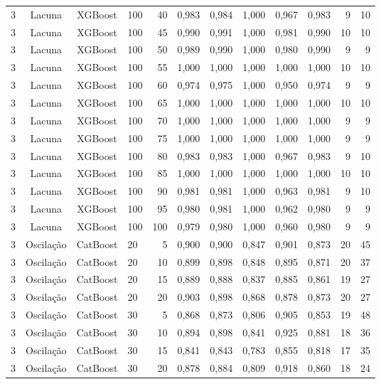 \begin{longtable}{ccclrrrrrrrr}
3 & Lacuna & XGBoost & 100 & 40 & 0,983 & 0,984 & 1,000 & 0,967 & 0,983 & 9 & 10 \\
3 & Lacuna & XGBoost & 100 & 45 & 0,990 & 0,991 & 1,000 & 0,981 & 0,990 & 10 & 10 \\
3 & Lacuna & XGBoost & 100 & 50 & 0,989 & 0,990 & 1,000 & 0,980 & 0,990 & 9 & 9 \\
3 & Lacuna & XGBoost & 100 & 55 & 1,000 & 1,000 & 1,000 & 1,000 & 1,000 & 10 & 10 \\
3 & Lacuna & XGBoost & 100 & 60 & 0,974 & 0,975 & 1,000 & 0,950 & 0,974 & 9 & 9 \\
3 & Lacuna & XGBoost & 100 & 65 & 1,000 & 1,000 & 1,000 & 1,000 & 1,000 & 10 & 10 \\
3 & Lacuna & XGBoost & 100 & 70 & 1,000 & 1,000 & 1,000 & 1,000 & 1,000 & 9 & 9 \\
3 & Lacuna & XGBoost & 100 & 75 & 1,000 & 1,000 & 1,000 & 1,000 & 1,000 & 9 & 9 \\
3 & Lacuna & XGBoost & 100 & 80 & 0,983 & 0,983 & 1,000 & 0,967 & 0,983 & 9 & 10 \\
3 & Lacuna & XGBoost & 100 & 85 & 1,000 & 1,000 & 1,000 & 1,000 & 1,000 & 10 & 10 \\
3 & Lacuna & XGBoost & 100 & 90 & 0,981 & 0,981 & 1,000 & 0,963 & 0,981 & 9 & 10 \\
3 & Lacuna & XGBoost & 100 & 95 & 0,980 & 0,981 & 1,000 & 0,962 & 0,980 & 9 & 9 \\
3 & Lacuna & XGBoost & 100 & 100 & 0,979 & 0,980 & 1,000 & 0,960 & 0,980 & 9 & 9 \\
3 & Oscilação & CatBoost & 20 & 5 & 0,900 & 0,900 & 0,847 & 0,901 & 0,873 & 20 & 45 \\
3 & Oscilação & CatBoost & 20 & 10 & 0,899 & 0,898 & 0,848 & 0,895 & 0,871 & 20 & 37 \\
3 & Oscilação & CatBoost & 20 & 15 & 0,889 & 0,888 & 0,837 & 0,885 & 0,861 & 19 & 27 \\
3 & Oscilação & CatBoost & 20 & 20 & 0,903 & 0,898 & 0,868 & 0,878 & 0,873 & 20 & 27 \\
3 & Oscilação & CatBoost & 30 & 5 & 0,868 & 0,873 & 0,806 & 0,905 & 0,853 & 19 & 48 \\
3 & Oscilação & CatBoost & 30 & 10 & 0,894 & 0,898 & 0,841 & 0,925 & 0,881 & 18 & 36 \\
3 & Oscilação & CatBoost & 30 & 15 & 0,841 & 0,843 & 0,783 & 0,855 & 0,818 & 17 & 35 \\
3 & Oscilação & CatBoost & 30 & 20 & 0,878 & 0,884 & 0,809 & 0,918 & 0,860 & 18 & 24 \\

\end{longtable}
